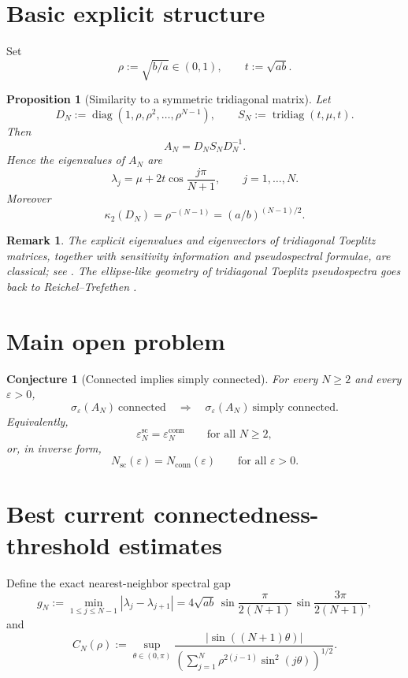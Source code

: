 \documentclass[11pt]{article}
\newtheorem{proposition}[theorem]{Proposition}
\newtheorem{conjecture}[theorem]{Conjecture}
\newtheorem{remark}[theorem]{Remark}
\newcommand{\eps}{\varepsilon}
\newcommand{\sig}{\sigma}
\newcommand{\tridiag}{\operatorname{tridiag}}
\newcommand{\conn}{\mathrm{conn}}
\newcommand{\scn}{\mathrm{sc}}
\newcommand{\diag}{\operatorname{diag}}
\begin{document}
\section{Basic explicit structure}

Set
\[
\rho:=\sqrt{b/a}\in(0,1),\qquad t:=\sqrt{ab}.
\]

\begin{proposition}[Similarity to a symmetric tridiagonal matrix]
\label{prop:similarity}
Let
\[
D_N:=\diag(1,\rho,\rho^2,\dots,\rho^{N-1}),
\qquad
S_N:=\tridiag(t,\mu,t).
\]
Then
\[
A_N=D_NS_ND_N^{-1}.
\]
Hence the eigenvalues of $A_N$ are
\[
\lambda_j=\mu+2t\cos\frac{j\pi}{N+1},
\qquad j=1,\dots,N.
\]
Moreover
\[
\kappa_2(D_N)=\rho^{-(N-1)}=(a/b)^{(N-1)/2}.
\]
\end{proposition}

\begin{remark}
The explicit eigenvalues and eigenvectors of tridiagonal Toeplitz matrices, together with sensitivity information and pseudospectral formulae, are classical; see \cite{NPR}. The ellipse-like geometry of tridiagonal Toeplitz pseudospectra goes back to Reichel--Trefethen \cite{RT}.
\end{remark}

\section{Main open problem}

\begin{conjecture}[Connected implies simply connected]
\label{conj:main}
For every $N\ge 2$ and every $\eps>0$,
\[
\sig_\eps(A_N)\ \text{connected}
\quad\Longrightarrow\quad
\sig_\eps(A_N)\ \text{simply connected}.
\]
Equivalently,
\[
\eps_N^{\scn}=\eps_N^{\conn}
\qquad\text{for all }N\ge 2,
\]
or, in inverse form,
\[
N_{\scn}(\eps)=N_{\conn}(\eps)
\qquad\text{for all }\eps>0.
\]
\end{conjecture}

\section{Best current connectedness-threshold estimates}

Define the exact nearest-neighbor spectral gap
\[
g_N:=\min_{1\le j\le N-1}|\lambda_j-\lambda_{j+1}|
=
4\sqrt{ab}\,
\sin\frac{\pi}{2(N+1)}\,
\sin\frac{3\pi}{2(N+1)},
\]
and
\[
C_N(\rho):=
\sup_{\theta\in(0,\pi)}
\frac{\bigl|\sin((N+1)\theta)\bigr|}
{\left(\sum_{j=1}^{N}\rho^{2(j-1)}\sin^2(j\theta)\right)^{1/2}}.
\]
\end{document}
